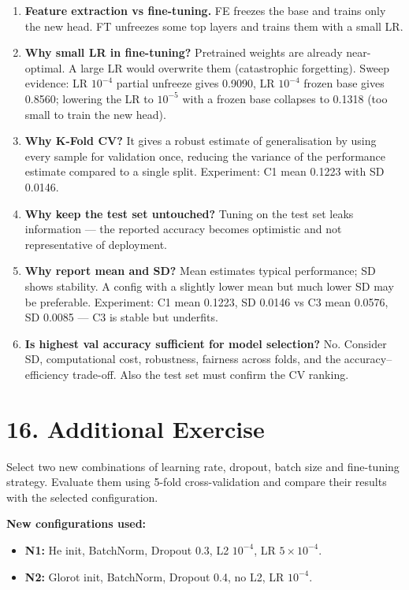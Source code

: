 \documentclass[10pt]{article}
\begin{document}
\begin{enumerate}
\item \textbf{Feature extraction vs fine-tuning.} FE freezes the base and trains only the new head. FT unfreezes some top layers and trains them with a small LR.

\item \textbf{Why small LR in fine-tuning?} Pretrained weights are already near-optimal. A large LR would overwrite them (catastrophic forgetting). Sweep evidence: LR $10^{-4}$ partial unfreeze gives 0.9090, LR $10^{-4}$ frozen base gives 0.8560; lowering the LR to $10^{-5}$ with a frozen base collapses to 0.1318 (too small to train the new head).

\item \textbf{Why K-Fold CV?} It gives a robust estimate of generalisation by using every sample for validation once, reducing the variance of the performance estimate compared to a single split. Experiment: C1 mean 0.1223 with SD 0.0146.

\item \textbf{Why keep the test set untouched?} Tuning on the test set leaks information --- the reported accuracy becomes optimistic and not representative of deployment.

\item \textbf{Why report mean and SD?} Mean estimates typical performance; SD shows stability. A config with a slightly lower mean but much lower SD may be preferable. Experiment: C1 mean 0.1223, SD 0.0146 vs C3 mean 0.0576, SD 0.0085 --- C3 is stable but underfits.

\item \textbf{Is highest val accuracy sufficient for model selection?} No. Consider SD, computational cost, robustness, fairness across folds, and the accuracy--efficiency trade-off. Also the test set must confirm the CV ranking.
\end{enumerate}

\section*{16. Additional Exercise}
Select two new combinations of learning rate, dropout, batch size and
fine-tuning strategy. Evaluate them using 5-fold cross-validation and
compare their results with the selected configuration.

\textbf{New configurations used:}
\begin{itemize}
\item \textbf{N1:} He init, BatchNorm, Dropout 0.3, L2 $10^{-4}$, LR $5\times10^{-4}$.
\item \textbf{N2:} Glorot init, BatchNorm, Dropout 0.4, no L2, LR $10^{-4}$.
\end{itemize}
\end{document}
